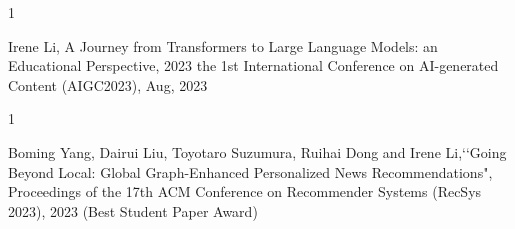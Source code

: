 








\begin{招待講演}{1}  %


Irene Li, A Journey from Transformers to Large Language Models: an Educational Perspective, 2023 the 1st International Conference on AI-generated Content (AIGC2023), Aug, 2023


\end{招待講演}  %






\begin{受賞}{1}  %

Boming Yang, Dairui Liu, Toyotaro Suzumura, Ruihai Dong and Irene Li,\lq\lq Going Beyond Local: Global Graph-Enhanced Personalized News Recommendations", Proceedings of the 17th ACM Conference on Recommender Systems  (RecSys 2023), 2023 (Best Student Paper Award)

\end{受賞}  %


